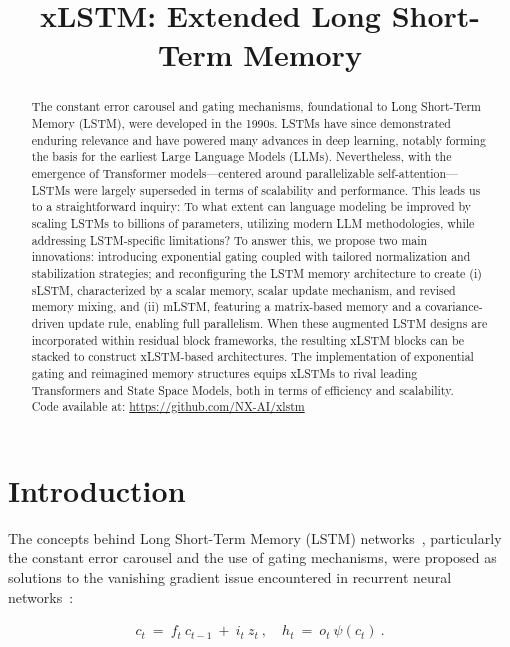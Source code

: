 \title{xLSTM: Extended Long Short-Term Memory}

\begin{abstract}
The constant error carousel and gating mechanisms, foundational to Long Short-Term Memory (LSTM), were developed in the 1990s. LSTMs have since demonstrated enduring relevance and have powered many advances in deep learning, notably forming the basis for the earliest Large Language Models (LLMs). Nevertheless, with the emergence of Transformer models—centered around parallelizable self-attention—LSTMs were largely superseded in terms of scalability and performance. This leads us to a straightforward inquiry: To what extent can language modeling be improved by scaling LSTMs to billions of parameters, utilizing modern LLM methodologies, while addressing LSTM-specific limitations? To answer this, we propose two main innovations: introducing exponential gating coupled with tailored normalization and stabilization strategies; and reconfiguring the LSTM memory architecture to create (i) sLSTM, characterized by a scalar memory, scalar update mechanism, and revised memory mixing, and (ii) mLSTM, featuring a matrix-based memory and a covariance-driven update rule, enabling full parallelism. When these augmented LSTM designs are incorporated within residual block frameworks, the resulting xLSTM blocks can be stacked to construct xLSTM-based architectures. The implementation of exponential gating and reimagined memory structures equips xLSTMs to rival leading Transformers and State Space Models, both in terms of efficiency and scalability.\\
Code available at: \url{https://github.com/NX-AI/xlstm}
\end{abstract}

\section{Introduction}
\label{sec:intro}

The concepts behind Long Short-Term Memory (LSTM) networks~\citep{Hochreiter:91,Hochreiter:97nips,Hochreiter:97}, particularly the constant error carousel and the use of gating mechanisms, were proposed as solutions to the vanishing gradient issue encountered in recurrent neural networks~\citep{Hochreiter:91,Hochreiter:00book}:

\begin{align}
\label{eq:lstm_idea}
  c_t \ = \ f_t \ c_{t-1} \ + \ 
          i_t \  z_t \ , \quad  
          h_t \ = \ o_t \ \psi({c_t}) \ . 
\end{align}

